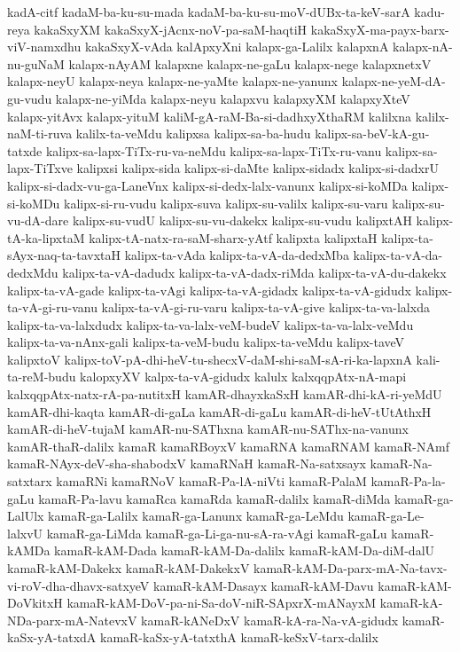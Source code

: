 {kadA-citf
kadaM-ba-ku-su-mada
kadaM-ba-ku-su-moV-dUBx-ta-keV-sarA
kadu-reya
kakaSxyXM
kakaSxyX-jAcnx-noV-pa-saM-haqtiH
kakaSxyX-ma-payx-barx-viV-namxdhu
kakaSxyX-vAda
kalApxyXni
kalapx-ga-Lalilx
kalapxnA
kalapx-nA-nu-guNaM
kalapx-nAyAM
kalapxne
kalapx-ne-gaLu
kalapx-nege
kalapxnetxV
kalapx-neyU
kalapx-neya
kalapx-ne-yaMte
kalapx-ne-yanunx
kalapx-ne-yeM-dA-gu-vudu
kalapx-ne-yiMda
kalapx-neyu
kalapxvu
kalapxyXM
kalapxyXteV
kalapx-yitAvx
kalapx-yituM
kaliM-gA-raM-Ba-si-dadhxyXthaRM
kalilxna
kalilx-naM-ti-ruva
kalilx-ta-veMdu
kalipxsa
kalipx-sa-ba-hudu
kalipx-sa-beV-kA-gu-tatxde
kalipx-sa-lapx-TiTx-ru-va-neMdu
kalipx-sa-lapx-TiTx-ru-vanu
kalipx-sa-lapx-TiTxve
kalipxsi
kalipx-sida
kalipx-si-daMte
kalipx-sidadx
kalipx-si-dadxrU
kalipx-si-dadx-vu-ga-LaneVnx
kalipx-si-dedx-lalx-vanunx
kalipx-si-koMDa
kalipx-si-koMDu
kalipx-si-ru-vudu
kalipx-suva
kalipx-su-valilx
kalipx-su-varu
kalipx-su-vu-dA-dare
kalipx-su-vudU
kalipx-su-vu-dakekx
kalipx-su-vudu
kalipxtAH
kalipx-tA-ka-lipxtaM
kalipx-tA-natx-ra-saM-sharx-yAtf
kalipxta
kalipxtaH
kalipx-ta-sAyx-naq-ta-tavxtaH
kalipx-ta-vAda
kalipx-ta-vA-da-dedxMba
kalipx-ta-vA-da-dedxMdu
kalipx-ta-vA-dadudx
kalipx-ta-vA-dadx-riMda
kalipx-ta-vA-du-dakekx
kalipx-ta-vA-gade
kalipx-ta-vAgi
kalipx-ta-vA-gidadx
kalipx-ta-vA-gidudx
kalipx-ta-vA-gi-ru-vanu
kalipx-ta-vA-gi-ru-varu
kalipx-ta-vA-give
kalipx-ta-va-lalxda
kalipx-ta-va-lalxdudx
kalipx-ta-va-lalx-veM-budeV
kalipx-ta-va-lalx-veMdu
kalipx-ta-va-nAnx-gali
kalipx-ta-veM-budu
kalipx-ta-veMdu
kalipx-taveV
kalipxtoV
kalipx-toV-pA-dhi-heV-tu-shecxV-daM-shi-saM-sA-ri-ka-lapxnA
kali-ta-reM-budu
kalopxyXV
kalpx-ta-vA-gidudx
kalulx
kalxqqpAtx-nA-mapi
kalxqqpAtx-natx-rA-pa-nutitxH
kamAR-dhayxkaSxH
kamAR-dhi-kA-ri-yeMdU
kamAR-dhi-kaqta
kamAR-di-gaLa
kamAR-di-gaLu
kamAR-di-heV-tUtAthxH
kamAR-di-heV-tujaM
kamAR-nu-SAThxna
kamAR-nu-SAThx-na-vanunx
kamAR-thaR-dalilx
kamaR
kamaRBoyxV
kamaRNA
kamaRNAM
kamaR-NAmf
kamaR-NAyx-deV-sha-shabodxV
kamaRNaH
kamaR-Na-satxsayx
kamaR-Na-satxtarx
kamaRNi
kamaRNoV
kamaR-Pa-lA-niVti
kamaR-PalaM
kamaR-Pa-la-gaLu
kamaR-Pa-lavu
kamaRca
kamaRda
kamaR-dalilx
kamaR-diMda
kamaR-ga-LalUlx
kamaR-ga-Lalilx
kamaR-ga-Lanunx
kamaR-ga-LeMdu
kamaR-ga-Le-lalxvU
kamaR-ga-LiMda
kamaR-ga-Li-ga-nu-sA-ra-vAgi
kamaR-gaLu
kamaR-kAMDa
kamaR-kAM-Dada
kamaR-kAM-Da-dalilx
kamaR-kAM-Da-diM-dalU
kamaR-kAM-Dakekx
kamaR-kAM-DakekxV
kamaR-kAM-Da-parx-mA-Na-tavx-vi-roV-dha-dhavx-satxyeV
kamaR-kAM-Dasayx
kamaR-kAM-Davu
kamaR-kAM-DoVkitxH
kamaR-kAM-DoV-pa-ni-Sa-doV-niR-SApxrX-mANayxM
kamaR-kA-NDa-parx-mA-NatevxV
kamaR-kANeDxV
kamaR-kA-ra-Na-vA-gidudx
kamaR-kaSx-yA-tatxdA
kamaR-kaSx-yA-tatxthA
kamaR-keSxV-tarx-dalilx
}
